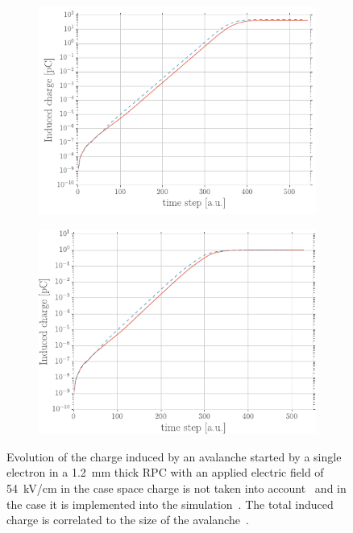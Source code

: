 	\begin{figure}[H]
		\begin{subfigure}{.5\linewidth}
			\centering
			\includegraphics[width = \linewidth]{fig/chapt3/Induced_charge_no_space_charge.pdf}
			\caption{\label{fig:Space-charge-effect:A}}
		\end{subfigure}
		\begin{subfigure}{.5\linewidth}
			\centering
			\includegraphics[width = \linewidth]{fig/chapt3/Induced_charge_w_space_charge.pdf}
			\caption{\label{fig:Space-charge-effect:B}}
		\end{subfigure}
		\caption{\label{fig:Space-charge-effect} Evolution of the charge induced by an avalanche started by a single electron in a \SI{1.2}{mm} thick RPC with an applied electric field of \SI{54}{kV/cm} in the case space charge is not taken into account~ and in the case it is implemented into the simulation~. The total induced charge is correlated to the size of the avalanche~\cite{VINCENT2017}.}
	\end{figure}
	
